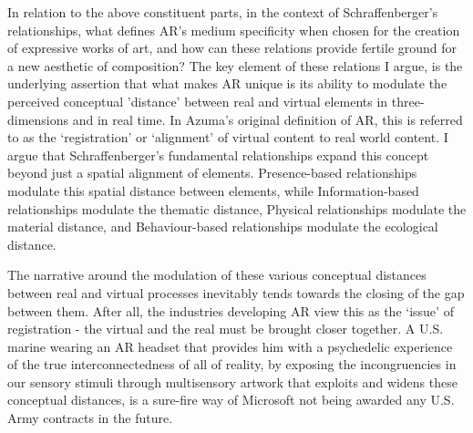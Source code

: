 In relation to the above constituent parts, in the context of Schraffenberger's relationships, what defines AR's medium specificity when chosen for the creation of expressive works of art, and how can these relations provide fertile ground for a new aesthetic of composition? The key element of these relations I argue, is the underlying assertion that what makes AR unique is its ability to modulate the perceived conceptual 'distance' between real and virtual elements in three-dimensions and in real time. In Azuma's \citeyearpar[]{azuma1997} original definition of AR, this is referred to as the `registration' or `alignment' of virtual content to real world content. I argue that Schraffenberger's fundamental relationships expand this concept beyond just a spatial alignment of elements. Presence-based relationships modulate this spatial distance between elements, while Information-based relationships modulate the thematic distance, Physical relationships modulate the material distance, and Behaviour-based relationships modulate the ecological distance. 

The narrative around the modulation of these various conceptual distances between real and virtual processes inevitably tends towards the closing of the gap between them. After all, the industries developing AR view this as the `issue' of registration - the virtual and the real must be brought closer together. A U.S. marine wearing an AR headset that provides him with a psychedelic experience of the true interconnectedness of all of reality, by exposing the incongruencies in our sensory stimuli through multisensory artwork that exploits and widens these conceptual distances, is a sure-fire way of Microsoft not being awarded any U.S. Army contracts in the future.

